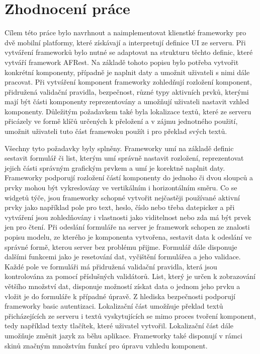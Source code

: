\section{Zhodnocení práce}
Cílem této práce bylo navrhnout a naimplementovat klienstké frameworky pro dvě mobilní platformy, které získávají a interpretují definice UI ze serveru. Při vytváření frameworků bylo nutné se adaptovat na strukturu těchto definic, které vytváří framework AFRest. Na základě tohoto popisu bylo potřeba vytvořit konkrétní komponenty, případně je naplnit daty a umožnit uživateli s nimi dále pracovat. Při vytváření komponent frameworky zohledňují rozložení komponent, přidružená validační pravidla, bezpečnost, různé typy aktivních prvků, kterými mají být části komponenty reprezentovány a umožňují uživateli nastavit vzhled komponenty. Důležitým požadavkem také byla lokalizace textů, které ze serveru přicázely ve formě klíčů určených k přeložení a v zájmu jednotného použití, umožnit uživateli tuto část framewoku použít i pro překlad svých textů. 

Všechny tyto požadavky byly splněny. Frameworky umí na základě definic sestavit formulář či list, kterým umí správně nastavit rozložení, reprezentovat jejich části správným grafickým prvkem a umí je korektně naplnit daty. Frameworky podporují rozložení částí komponenty do jednoho či dvou sloupců a prvky mohou být vykreslovány ve vertikálním i horizontálním směru. Co se widgetů týče, jsou frameworky schopné vytvořit nejčastěji používané aktivní prvky jako například pole pro text, heslo, číslo nebo třeba datepicker a při vytváření jsou zohledňovány i vlastnosti jako viditelnost nebo zda má být prvek jen pro čtení. Při odeslání formuláře na server je framework schopen ze znalosti popisu modelu, ze kterého je komponenta vytvořena, sestavit data k odeslání ve správné formě, kterou server bez problému přijme. Formulář dále disponuje dalšími funkcemi jako je resetování dat, vyčištění formulářea a jeho validace. Každé pole ve formuláři má přidružená validační pravidla, která jsou kontrolována za pomocí příslušných validátorů. List, který je určen k zobrazování většího množství dat, disponuje možností získat data o jednom jeho prvku a vložit je do formuláře k případné úpravě. Z hlediska bezpečnosti podporují frameworky basic autentizaci. Lokalizační část umožňuje překlad textů přicházejících ze serveru i textů vyskytujících se mimo proces tvoření komponent, tedy například texty tlačítek, které uživatel vytvořil. Lokalizační část dále umožňuje změnit jazyk za běhu aplikace. Frameworky také disponují v rámci skinů značným množstvím funkcí pro úpravu vzhledu komponent.

